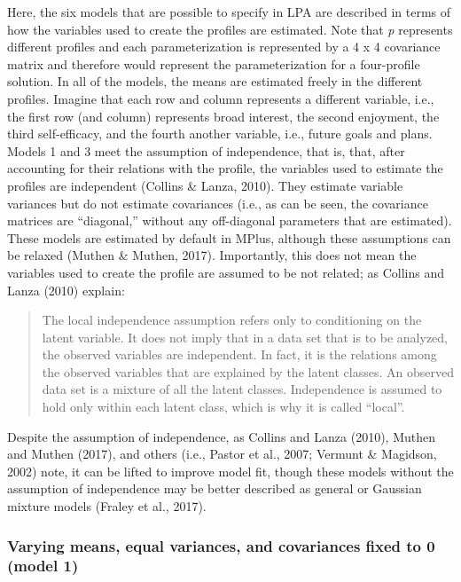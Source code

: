 \documentclass[]{msu-thesis}
\theoremstyle{definition}
\theoremstyle{definition}
\theoremstyle{definition}
\theoremstyle{remark}
\begin{document}
Here, the six models that are possible to specify in LPA are described
in terms of how the variables used to create the profiles are estimated.
Note that \emph{p} represents different profiles and each
parameterization is represented by a 4 x 4 covariance matrix and
therefore would represent the parameterization for a four-profile
solution. In all of the models, the means are estimated freely in the
different profiles. Imagine that each row and column represents a
different variable, i.e., the first row (and column) represents broad
interest, the second enjoyment, the third self-efficacy, and the fourth
another variable, i.e., future goals and plans. Models 1 and 3 meet the
assumption of independence, that is, that, after accounting for their
relations with the profile, the variables used to estimate the profiles
are independent (Collins \& Lanza, 2010). They estimate variable
variances but do not estimate covariances (i.e., as can be seen, the
covariance matrices are ``diagonal,'' without any off-diagonal
parameters that are estimated). These models are estimated by default in
MPlus, although these assumptions can be relaxed (Muthen \& Muthen,
2017). Importantly, this does not mean the variables used to create the
profile are assumed to be not related; as Collins and Lanza (2010)
explain:

\begin{quote}
The local independence assumption refers only to conditioning on the
latent variable. It does not imply that in a data set that is to be
analyzed, the observed variables are independent. In fact, it is the
relations among the observed variables that are explained by the latent
classes. An observed data set is a mixture of all the latent classes.
Independence is assumed to hold only within each latent class, which is
why it is called ``local''.
\end{quote}

Despite the assumption of independence, as Collins and Lanza (2010),
Muthen and Muthen (2017), and others (i.e., Pastor et al., 2007; Vermunt
\& Magidson, 2002) note, it can be lifted to improve model fit, though
these models without the assumption of independence may be better
described as general or Gaussian mixture models (Fraley et al., 2017).

\subsubsection{Varying means, equal variances, and covariances fixed to
0 (model
1)}\label{varying-means-equal-variances-and-covariances-fixed-to-0-model-1}
\end{document}
